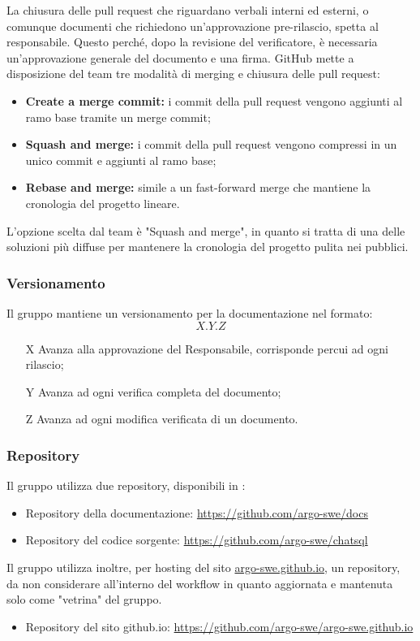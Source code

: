 \par La chiusura delle pull request che riguardano verbali interni ed esterni, o comunque documenti che richiedono un’approvazione pre-rilascio, spetta al responsabile. Questo perché, dopo la revisione del verificatore, è necessaria un’approvazione generale del documento e una firma. GitHub mette a disposizione del team tre modalità di merging e chiusura delle pull request:
\begin{itemize}
  \item \textbf{Create a merge commit:} i commit della pull request vengono aggiunti al ramo base tramite un merge commit;
  \item \textbf{Squash and merge:} i commit della pull request vengono compressi in un unico commit e aggiunti al ramo base;
  \item \textbf{Rebase and merge:} simile a un fast-forward merge che mantiene la cronologia del progetto lineare.
\end{itemize}
\par L'opzione scelta dal team è "Squash and merge", in quanto si tratta di una delle soluzioni più diffuse per mantenere la cronologia del progetto pulita nei  pubblici.

\subsubsection{Versionamento}
Il gruppo mantiene un versionamento per la documentazione nel formato:
\[ X.Y.Z \]
\begin{itemize}
  \item[X] Avanza alla approvazione del Responsabile, corrisponde percui ad ogni rilascio;
  \item[Y] Avanza ad ogni verifica completa del documento;
  \item[Z] Avanza ad ogni modifica verificata di un documento.
\end{itemize}

\subsubsection{Repository}
Il gruppo utilizza due repository, disponibili in :
\begin{itemize}
  \item Repository della documentazione: \href{https://github.com/argo-swe/docs}{https://github.com/argo-swe/docs}
  \item Repository del codice sorgente: \href{https://github.com/argo-swe/chatsql}{https://github.com/argo-swe/chatsql}
\end{itemize}
Il gruppo utilizza inoltre, per hosting del sito \href{https://argo-swe.github.io}{argo-swe.github.io}, un repository, da non considerare all'interno del workflow in quanto aggiornata e mantenuta solo come "vetrina" del gruppo.
\begin{itemize}
  \item Repository del sito github.io: \href{https://github.com/argo-swe/argo-swe.github.io}{https://github.com/argo-swe/argo-swe.github.io}
\end{itemize}

